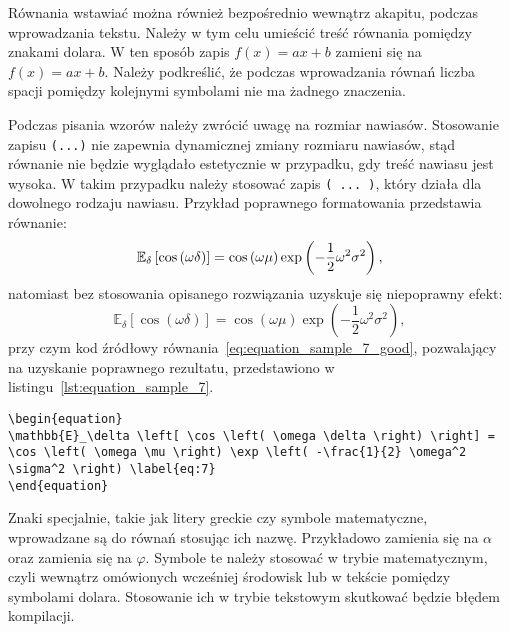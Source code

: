 Równania wstawiać można również bezpośrednio wewnątrz akapitu, podczas wprowadzania tekstu. Należy w tym celu umieścić treść równania pomiędzy znakami dolara. W ten sposób zapis \texttt{$f(x) = ax + b$} zamieni się na $f(x) = ax + b$. Należy podkreślić, że podczas wprowadzania równań liczba spacji pomiędzy kolejnymi symbolami nie ma żadnego znaczenia.

Podczas pisania wzorów należy zwrócić uwagę na rozmiar nawiasów. Stosowanie zapisu \texttt{(...)} nie zapewnia dynamicznej zmiany rozmiaru nawiasów, stąd równanie nie będzie wyglądało estetycznie w przypadku, gdy treść nawiasu jest wysoka. W takim przypadku należy stosować zapis \texttt{\left( ... \right)}, który działa dla dowolnego rodzaju nawiasu. Przykład poprawnego formatowania przedstawia równanie:
\begin{equation}
\mathbb{E}_\delta \left[ \cos \left(\omega \delta\right) \right] = \cos \left(\omega \mu\right) \exp \left(-\frac{1}{2} \omega^2 \sigma^2\right) \label{eq:equation_sample_7_good},
\end{equation}
natomiast bez stosowania opisanego rozwiązania uzyskuje się niepoprawny efekt:
\begin{equation}
\mathbb{E}_\delta [ \cos (\omega \delta) ] = \cos (\omega \mu) \exp (-\frac{1}{2} \omega^2 \sigma^2) \label{eq:equation_sample_7_bad},
\end{equation}
przy czym kod źródłowy równania~\eqref{eq:equation_sample_7_good}, pozwalający na uzyskanie poprawnego rezultatu, przedstawiono w listingu~\ref{lst:equation_sample_7}.

\begin{listing}[htb]
\begin{verbatim}
\begin{equation}
\mathbb{E}_\delta \left[ \cos \left( \omega \delta \right) \right] = \cos \left( \omega \mu \right) \exp \left( -\frac{1}{2} \omega^2 \sigma^2 \right) \label{eq:7}
\end{equation}
\end{verbatim}
\end{listing}

Znaki specjalnie, takie jak litery greckie czy symbole matematyczne, wprowadzane są do równań stosując ich nazwę. Przykładowo \texttt{\alpha} zamienia się na $\alpha$ oraz \texttt{\varphi} zamienia się na $\varphi$. Symbole te należy stosować w trybie matematycznym, czyli wewnątrz omówionych wcześniej środowisk lub w tekście pomiędzy symbolami dolara. Stosowanie ich w trybie tekstowym skutkować będzie błędem kompilacji.

